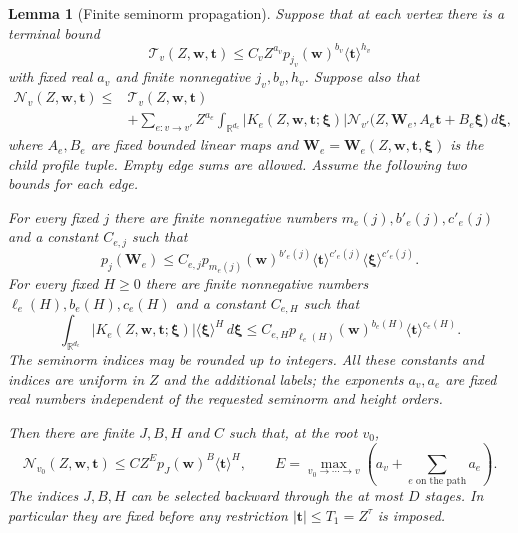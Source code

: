 \documentclass[11pt,a4paper]{article}
\numberwithin{equation}{section}
\numberwithin{figure}{section}
\newtheorem{lemma}[theorem]{Lemma}
\theoremstyle{definition}
\theoremstyle{remark}
\begin{document}
\begin{lemma}[Finite seminorm propagation]\label{lem:finite-seminorm-propagation}
Suppose that at each vertex there is a terminal bound
\[
 \mathcal T_v(Z,\boldsymbol w,\boldsymbol t)
 \le C_v Z^{a_v}p_{j_v}(\boldsymbol w)^{b_v}
                   \langle\boldsymbol t\rangle^{h_v}
\]
with fixed real $a_v$ and finite nonnegative $j_v,b_v,h_v$.  Suppose also that
\[
 \begin{split}
 \mathcal N_v(Z,\boldsymbol w,\boldsymbol t)
 \le{}&\mathcal T_v(Z,\boldsymbol w,\boldsymbol t)\\
 &+\sum_{e:v\to v'}Z^{a_e}\int_{\mathbb R^{d_e}}
 |K_e(Z,\boldsymbol w,\boldsymbol t;\boldsymbol\xi)|
 \mathcal N_{v'}\bigl(Z,\boldsymbol W_e,
       A_e\boldsymbol t+B_e\boldsymbol\xi\bigr)\,d\boldsymbol\xi,
 \end{split}
\]
where $A_e,B_e$ are fixed bounded linear maps and
$\boldsymbol W_e=\boldsymbol W_e(Z,\boldsymbol w,\boldsymbol t,
\boldsymbol\xi)$ is the child profile tuple.  Empty edge sums are allowed.
Assume the following two bounds for each edge.

For every fixed $j$ there are finite nonnegative numbers
$m_e(j),b'_e(j),c'_e(j)$ and a constant $C_{e,j}$ such that
\[
 p_j(\boldsymbol W_e)
 \le C_{e,j}p_{m_e(j)}(\boldsymbol w)^{b'_e(j)}
       \langle\boldsymbol t\rangle^{c'_e(j)}
       \langle\boldsymbol\xi\rangle^{c'_e(j)}.
\]
For every fixed $H\ge0$ there are finite nonnegative numbers
$\ell_e(H),b_e(H),c_e(H)$ and a constant $C_{e,H}$ such that
\[
 \int_{\mathbb R^{d_e}}|K_e(Z,\boldsymbol w,\boldsymbol t;
            \boldsymbol\xi)|\langle\boldsymbol\xi\rangle^H
                         \,d\boldsymbol\xi
 \le C_{e,H}p_{\ell_e(H)}(\boldsymbol w)^{b_e(H)}
                 \langle\boldsymbol t\rangle^{c_e(H)}.
\]
The seminorm indices may be rounded up to integers.  All these constants and
indices are uniform in $Z$ and the additional labels; the exponents $a_v,a_e$
are fixed real numbers independent of the requested seminorm and height orders.

Then there are finite $J,B,H$ and $C$ such that, at the root $v_0$,
\[
 \mathcal N_{v_0}(Z,\boldsymbol w,\boldsymbol t)
 \le C Z^E p_J(\boldsymbol w)^B\langle\boldsymbol t\rangle^H,
 \qquad
 E=\max_{v_0\to\cdots\to v}
       \left(a_v+\sum_{e\text{ on the path}}a_e\right).
\]
The indices $J,B,H$ can be selected backward through the at most $D$ stages.
In particular they are fixed before any restriction
$|\boldsymbol t|\le T_1=Z^\tau$ is imposed.


\end{lemma}
\end{document}

